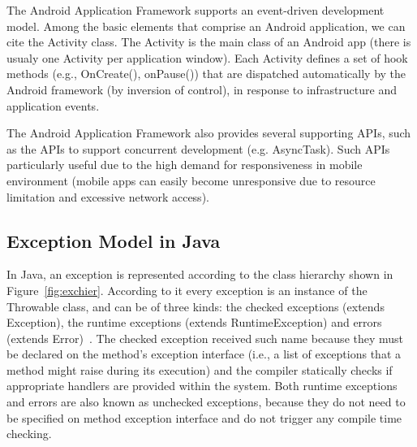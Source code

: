 \documentclass[conference]{IEEEtran}
\begin{document}

The Android Application Framework supports an event-driven development model. 
Among the basic elements that comprise an Android application, we can cite the
 Activity class. The Activity is the main class of an Android app (there is usualy one
Activity per application window). Each Activity defines a set of hook methods  
(e.g., OnCreate(), onPause()) that are dispatched automatically by the Android 
framework (by inversion of control), in response to infrastructure and application events.

The Android Application Framework also provides several supporting APIs, such as 
the APIs to support concurrent development (e.g. AsyncTask). 
Such APIs particularly useful due to the high demand for responsiveness 
in mobile environment (mobile apps can easily become 
unresponsive due to resource limitation and excessive network access).



\subsection{Exception Model in Java} \label{sec:extypes}

In Java, an exception is represented according to the class hierarchy shown in
Figure~\ref{fig:exchier}.  According to it every exception is an
instance of the Throwable class, and can be of three kinds: the checked exceptions
(extends Exception), the runtime exceptions (extends RuntimeException) and errors
(extends Error)~\cite{gosling2000java}. The checked exception received such name
 because they must be declared on the method's exception interface (i.e., a list of exceptions that a method 
might raise during its execution) and the compiler statically checks if
 appropriate handlers are provided within the system.
Both runtime exceptions and errors are also known as unchecked exceptions, because 
they do not need to be specified on method exception interface and do not trigger any 
compile time checking.
\end{document}
